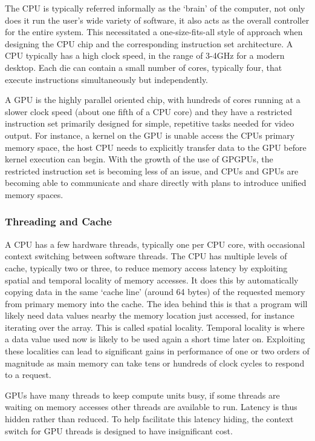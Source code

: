The CPU is typically referred informally as the `brain' of the computer, not
only does it run the user's wide variety of software, it also acts as the
overall controller for the entire system. This necessitated a one-size-fits-all
style of approach when designing the CPU chip and the corresponding instruction
set architecture. A CPU typically has a high clock speed, in the range of 3-4GHz
for a modern desktop. Each die can contain a small number of cores, typically
four, that execute instructions simultaneously but independently.

A GPU is the highly parallel oriented chip, with hundreds of cores running at a
slower clock speed (about one fifth of a CPU core) and they have a restricted
instruction set primarily designed for simple, repetitive tasks needed for video
output. For instance, a kernel on the GPU is unable access the CPUs primary
memory space, the host CPU needs to explicitly transfer data to the GPU before
kernel execution can begin. With the growth of the use of GPGPUs, the restricted
instruction set is becoming less of an issue, and CPUs and GPUs are becoming
able to communicate and share directly with plans to introduce unified memory
spaces.

\subsubsection{Threading and Cache}

A CPU has a few hardware threads, typically one per CPU core, with occasional
context switching between software threads. The CPU has multiple levels of
cache, typically two or three, to reduce memory access latency by exploiting
spatial and temporal locality of memory accesses. It does this by automatically
copying data in the same `cache line' (around 64 bytes) of the requested memory
from primary memory into the cache. The idea behind this is that a program will
likely need data values nearby the memory location just accessed, for instance
iterating over the array. This is called spatial locality. Temporal locality is
where a data value used now is likely to be used again a short time later on.
Exploiting these localities can lead to significant gains in performance of one
or two orders of magnitude as main memory can take tens or hundreds of clock
cycles to respond to a request.

GPUs have many threads to keep compute units busy, if some threads are waiting
on memory accesses other threads are available to run. Latency is thus hidden
rather than reduced. To help facilitate this latency hiding, the context switch
for GPU threads is designed to have insignificant cost.


